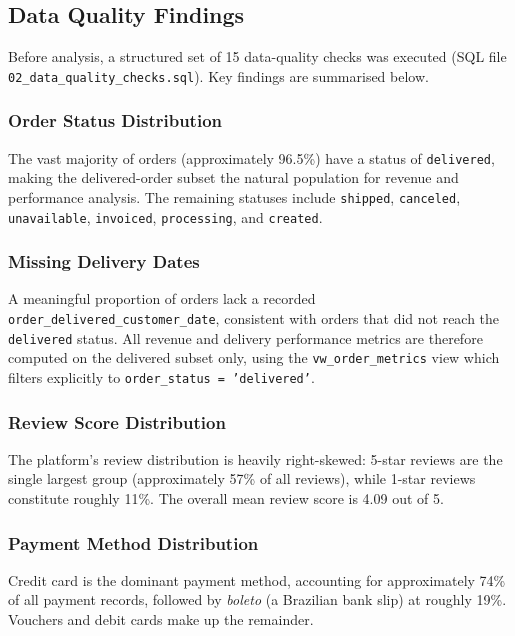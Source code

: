 \documentclass[12pt,a4paper]{article}
\begin{document}
\subsection{Data Quality Findings}

Before analysis, a structured set of 15 data-quality checks was executed (SQL file
\texttt{02\_data\_quality\_checks.sql}). Key findings are summarised below.

\subsubsection{Order Status Distribution}

The vast majority of orders (approximately 96.5\%) have a status of \texttt{delivered},
making the delivered-order subset the natural population for revenue and performance
analysis. The remaining statuses include \texttt{shipped}, \texttt{canceled},
\texttt{unavailable}, \texttt{invoiced}, \texttt{processing}, and \texttt{created}.

\subsubsection{Missing Delivery Dates}

A meaningful proportion of orders lack a recorded \texttt{order\_delivered\_customer\_date},
consistent with orders that did not reach the \texttt{delivered} status. All revenue and
delivery performance metrics are therefore computed on the delivered subset only, using the
\texttt{vw\_order\_metrics} view which filters explicitly to \texttt{order\_status =
'delivered'}.

\subsubsection{Review Score Distribution}

The platform's review distribution is heavily right-skewed: 5-star reviews are the single
largest group (approximately 57\% of all reviews), while 1-star reviews constitute roughly
11\%. The overall mean review score is 4.09 out of 5.

\subsubsection{Payment Method Distribution}

Credit card is the dominant payment method, accounting for approximately 74\% of all
payment records, followed by \textit{boleto} (a Brazilian bank slip) at roughly 19\%.
Vouchers and debit cards make up the remainder.
\end{document}
